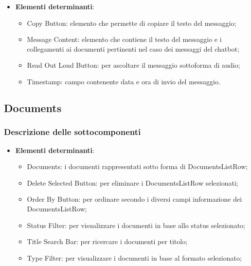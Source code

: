 \documentclass[10pt, a4paper]{article}
\begin{document}
\label{MessageCardDettaglio}
\begin{itemize}
    \item \textbf{Elementi determinanti}:
    \begin{itemize}
        \item Copy Button: elemento che permette di copiare il testo del messaggio;
        \item Message Content: elemento che contiene il testo del messaggio e i collegamenti ai documenti pertinenti nel caso dei messaggi del chatbot;
        \item Read Out Loud Button: per ascoltare il messaggio sottoforma di audio;
        \item Timestamp: campo contenente data e ora di invio del messaggio.
    \end{itemize}
\end{itemize}



\subsection{Documents}

\subsubsection{Descrizione delle sottocomponenti}

\label{DocumentsListDettaglio}
\begin{itemize}
    \item \textbf{Elementi determinanti}:
     \begin{itemize}
        \item Documents: i documenti rappresentati sotto forma di DocumentsListRow;
        \item Delete Selected Button: per eliminare i DocumentsListRow selezionati;
        \item Order By Button: per ordinare secondo i diversi campi informazione dei DocumentsListRow;
        \item Status Filter: per visualizzare i documenti in base allo status selezionato;
        \item Title Search Bar: per ricercare i documenti per titolo;
        \item Type Filter: per visualizzare i documenti in base al formato selezionato; 
    \end{itemize}
\end{itemize}
\end{document}
